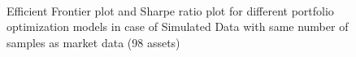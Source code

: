 \begin{figure}[!h]
    
    
     \hfill
   \\
   \caption{Efficient Frontier plot and Sharpe ratio plot for different portfolio optimization models in case of Simulated Data with same number of samples as market data (98 assets)}
   \label{fig:5}
\end{figure}

